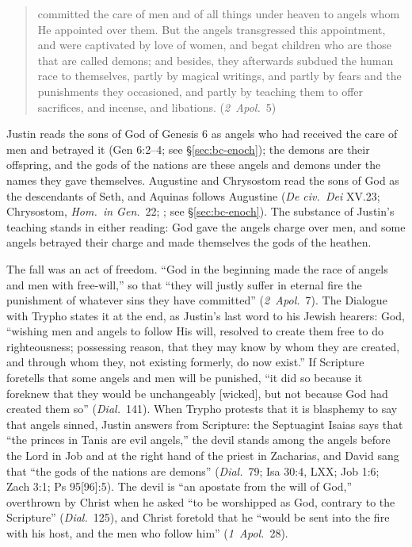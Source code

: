 \begin{quote}
committed the care of men and of all things under heaven to angels whom
He appointed over them. But the angels transgressed this appointment,
and were captivated by love of women, and begat children who are those
that are called demons; and besides, they afterwards subdued the human
race to themselves, partly by magical writings, and partly by fears and
the punishments they occasioned, and partly by teaching them to offer
sacrifices, and incense, and libations. (\emph{2~Apol.}\ 5)
\end{quote}

\noindent Justin reads the sons of God of Genesis 6 as angels who had
received the care of men and betrayed it (Gen 6:2--4; see
\S\ref{sec:bc-enoch}); the demons are
their offspring, and the gods of the nations are these angels and demons
under the names they gave themselves. Augustine and Chrysostom read the
sons of God as the descendants of Seth, and Aquinas follows Augustine
(\emph{De civ.\ Dei} XV.23; Chrysostom, \emph{Hom.\ in Gen.}\ 22;
; see \S\ref{sec:bc-enoch}). The substance of
Justin's teaching stands in either reading: God gave the angels charge
over men, and some angels betrayed their charge and made themselves the
gods of the heathen.

The fall was an act of freedom. ``God in the beginning made the race of
angels and men with free-will,'' so that ``they will justly suffer in
eternal fire the punishment of whatever sins they have committed''
(\emph{2~Apol.}\ 7). The Dialogue with Trypho states it at the end, as
Justin's last word to his Jewish hearers: God, ``wishing men and angels to
follow His will, resolved to create them free to do righteousness;
possessing reason, that they may know by whom they are created, and
through whom they, not existing formerly, do now exist.'' If Scripture
foretells that some angels and men will be punished, ``it did so because it
foreknew that they would be unchangeably [wicked], but not because God had
created them so'' (\emph{Dial.}\ 141). When Trypho protests that it is
blasphemy to say that angels sinned, Justin answers from Scripture: the
Septuagint Isaias says that ``the princes in Tanis are evil angels,'' the
devil stands among the angels before the Lord in Job and at the right hand
of the priest in Zacharias, and David sang that ``the gods of the nations
are demons'' (\emph{Dial.}\ 79; Isa 30:4, LXX; Job 1:6; Zach 3:1; Ps
95[96]:5). The devil is ``an apostate from the will of God,'' overthrown by
Christ when he asked ``to be worshipped as God, contrary to the Scripture''
(\emph{Dial.}\ 125), and Christ foretold that he ``would be sent into the
fire with his host, and the men who follow him'' (\emph{1~Apol.}\ 28).

